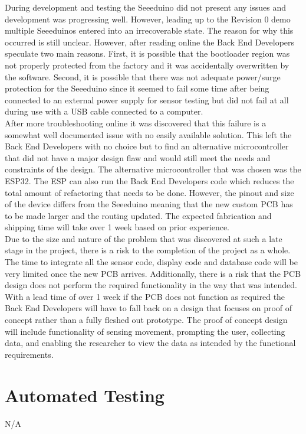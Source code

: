 \documentclass[12pt, titlepage]{article}
\begin{document}
During development and testing the Seeeduino did not present any issues and development was progressing well. However, leading up to the Revision 0 demo multiple Seeeduinos entered into an irrecoverable state. The reason for why this occurred is still unclear. However, after reading online the Back End Developers speculate two main reasons. First, it is possible that the bootloader region was not properly protected from the factory and it was accidentally overwritten by the software. Second, it is possible that there was not adequate power/surge protection for the Seeeduino since it seemed to fail some time after being connected to an external power supply for sensor testing but did not fail at all during use with a USB cable connected to a computer. \\

After more troubleshooting online it was discovered that this failure is a somewhat well documented issue with no easily available solution. This left the Back End Developers with no choice but to find an alternative microcontroller that did not have a major design flaw and would still meet the needs and constraints of the design. The alternative microcontroller that was chosen was the ESP32. The ESP can also run the Back End Developers code which reduces the total amount of refactoring that needs to be done. However, the pinout and size of the device differs from the Seeeduino meaning that the new custom PCB has to be made larger and the routing updated. The expected fabrication and shipping time will take over 1 week based on prior experience. \\

Due to the size and nature of the problem that was discovered at such a late stage in the project, there is a risk to the completion of the project as a whole. The time to integrate all the sensor code, display code and database code will be very limited once the new PCB arrives. Additionally, there is a risk that the PCB design does not perform the required functionality in the way that was intended. With a lead time of over 1 week if the PCB does not function as required the Back End Developers will have to fall back on a design that focuses on proof of concept rather than a fully fleshed out prototype. The proof of concept design will include functionality of sensing movement, prompting the user, collecting data, and enabling the researcher to view the data as intended by the functional requirements. \\

\section{Automated Testing}
N/A
\end{document}
